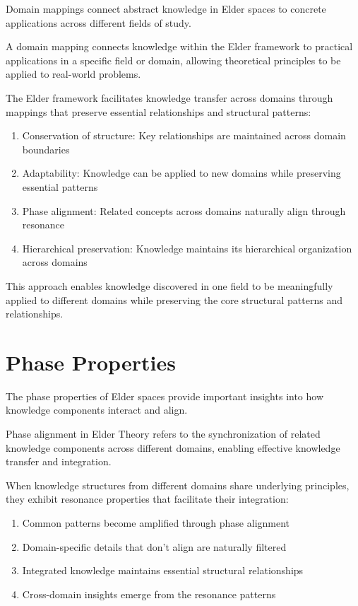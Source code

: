 Domain mappings connect abstract knowledge in Elder spaces to concrete applications across different fields of study.

\begin{definition}
A domain mapping connects knowledge within the Elder framework to practical applications in a specific field or domain, allowing theoretical principles to be applied to real-world problems.
\end{definition}

\begin{theorem}
The Elder framework facilitates knowledge transfer across domains through mappings that preserve essential relationships and structural patterns:
\begin{enumerate}
    \item Conservation of structure: Key relationships are maintained across domain boundaries
    \item Adaptability: Knowledge can be applied to new domains while preserving essential patterns
    \item Phase alignment: Related concepts across domains naturally align through resonance
    \item Hierarchical preservation: Knowledge maintains its hierarchical organization across domains
\end{enumerate}
\end{theorem}

This approach enables knowledge discovered in one field to be meaningfully applied to different domains while preserving the core structural patterns and relationships.

\section{Phase Properties}

The phase properties of Elder spaces provide important insights into how knowledge components interact and align.

\begin{definition}
Phase alignment in Elder Theory refers to the synchronization of related knowledge components across different domains, enabling effective knowledge transfer and integration.
\end{definition}

\begin{theorem}
When knowledge structures from different domains share underlying principles, they exhibit resonance properties that facilitate their integration:
\begin{enumerate}
    \item Common patterns become amplified through phase alignment
    \item Domain-specific details that don't align are naturally filtered
    \item Integrated knowledge maintains essential structural relationships
    \item Cross-domain insights emerge from the resonance patterns
\end{enumerate}
\end{theorem}

